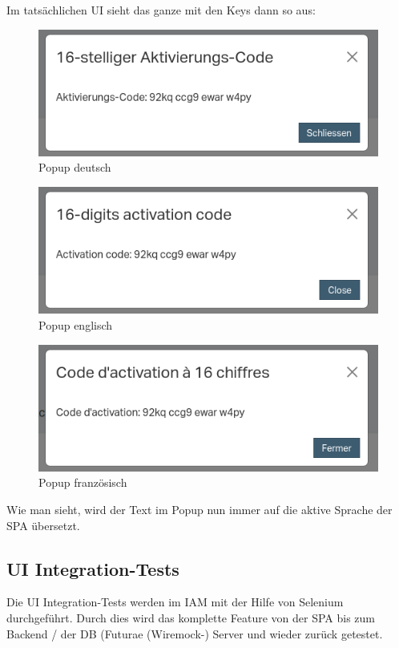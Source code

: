 Im tatsächlichen UI sieht das ganze mit den Keys dann so aus:
\begin{figure}[H]
	\begin{center}
		\includegraphics[width=1.0\textwidth]{ressourcen/popup-de}
		\caption[Popup deutsch]{Popup deutsch}\label{fig:popup-de}
	\end{center}
\end{figure}
\begin{figure}[H]
	\begin{center}
		\includegraphics[width=1.0\textwidth]{ressourcen/popup-en}
			\caption[Popup englisch]{Popup englisch}\label{fig:popup-en}
	\end{center}
\end{figure}	
\begin{figure}[H]
	\begin{center}
		\includegraphics[width=1.0\textwidth]{ressourcen/popup-fr}
		\caption[Popup französisch]{Popup französisch}\label{fig:popup-fr}
	\end{center}
\end{figure}
\noindent Wie man sieht, wird der Text im Popup nun immer auf die aktive Sprache der SPA übersetzt.
\subsection{UI Integration-Tests}
Die UI Integration-Tests werden im IAM mit der Hilfe von Selenium durchgeführt. Durch dies wird das komplette Feature von der SPA bis zum Backend / der DB (Futurae (Wiremock-) Server und wieder zurück getestet.














